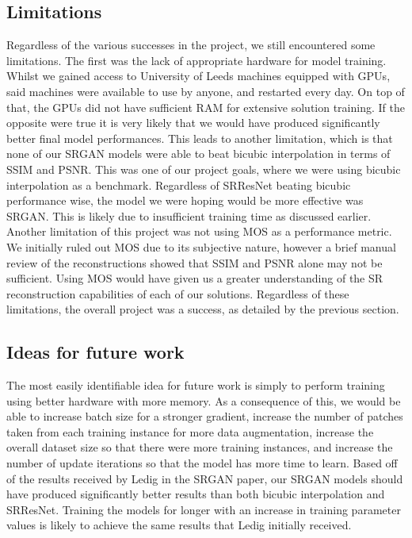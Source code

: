 \subsection{Limitations}
Regardless of the various successes in the project, we still encountered some limitations. The first was the lack of appropriate hardware for model training. Whilst we gained access to University of Leeds machines equipped with GPUs, said machines were available to use by anyone, and restarted every day. On top of that, the GPUs did not have sufficient RAM for extensive solution training. If the opposite were true it is very likely that we would have produced significantly better final model performances. This leads to another limitation, which is that none of our SRGAN models were able to beat bicubic interpolation in terms of SSIM and PSNR. This was one of our project goals, where we were using bicubic interpolation as a benchmark. Regardless of SRResNet beating bicubic performance wise, the model we were hoping would be more effective was SRGAN. This is likely due to insufficient training time as discussed earlier. Another limitation of this project was not using MOS as a performance metric. We initially ruled out MOS due to its subjective nature, however a brief manual review of the reconstructions showed that SSIM and PSNR alone may not be sufficient. Using MOS would have given us a greater understanding of the SR reconstruction capabilities of each of our solutions. Regardless of these limitations, the overall project was a success, as detailed by the previous section.

\subsection{Ideas for future work}
The most easily identifiable idea for future work is simply to perform training using better hardware with more memory. As a consequence of this, we would be able to increase batch size for a stronger gradient, increase the number of patches taken from each training instance for more data augmentation, increase the overall dataset size so that there were more training instances, and increase the number of update iterations so that the model has more time to learn. Based off of the results received by Ledig \etal in the SRGAN paper, our SRGAN models should have produced significantly better results than both bicubic interpolation and SRResNet. Training the models for longer with an increase in training parameter values is likely to achieve the same results that Ledig \etal initially received.  

